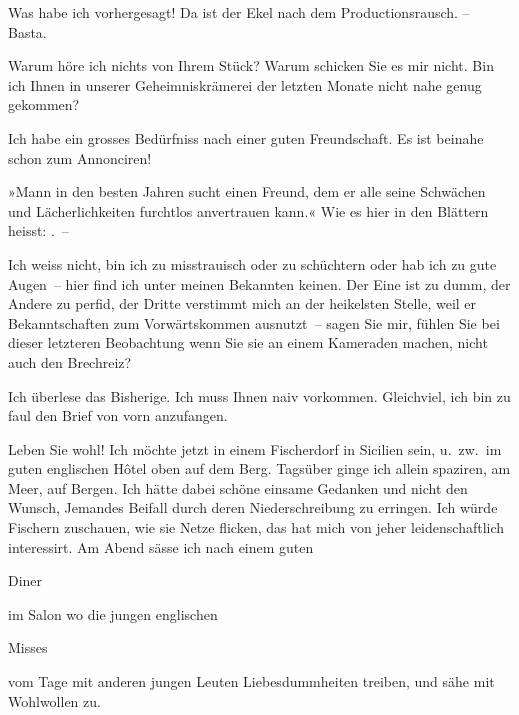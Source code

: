 \pstart
           Was habe ich vorhergesagt! Da ist der Ekel nach dem Productionsrausch. – Basta.\pend
           
\pstart
           Warum höre ich nichts von Ihrem Stück? Warum schicken Sie es mir nicht. Bin ich Ihnen in unserer
               Geheimniskrämerei der letzten Monate nicht nahe genug gekommen?\pend
           
\pstart
           Ich habe ein grosses Bedürfniss nach einer guten Freundschaft. Es ist beinahe schon
               zum Annonciren!\pend
           
\pstart
           »Mann in den besten Jahren sucht einen Freund, dem er alle seine Schwächen und
               Lächerlichkeiten furchtlos anvertrauen kann.« Wie es hier in den Blättern {\pb}heisst: \label{K_L03848-2v}\label{K_L03848-2}. –\pend
           
\pstart
           Ich weiss nicht, bin ich zu misstrauisch oder zu schüchtern oder  hab ich zu gute Augen – hier find ich unter meinen
               Bekannten keinen. Der Eine ist zu dumm, der Andere zu perfid, der Dritte verstimmt
               mich an der heikelsten Stelle, weil er Bekanntschaften zum Vorwärtskommen ausnutzt –
               sagen Sie mir, fühlen Sie bei dieser letzteren Beobachtung wenn Sie sie an einem
               Kameraden machen, nicht auch den Brechreiz?\pend
           
\pstart
           Ich überlese das Bisherige. Ich muss Ihnen naiv vorkommen. Gleichviel, ich bin zu
               faul den Brief von vorn anzufangen.\pend
           
\pstart
           Leben Sie wohl! Ich möchte jetzt in einem Fischerdorf in Sicilien sein, u. zw. im guten englischen Hôtel oben auf dem
               Berg. Tagsüber ginge ich allein {\pb}spaziren, am Meer, auf Bergen. Ich hätte dabei schöne einsame Gedanken und nicht
               den Wunsch, Jemandes Beifall durch deren Niederschreibung zu erringen. Ich würde
               Fischern zuschauen, wie sie Netze flicken, das hat mich von jeher leidenschaftlich
               interessirt. Am Abend sässe ich nach einem guten \begin{otherlanguage}{french}Diner\end{otherlanguage}{ }im Salon wo die jungen
               englischen \begin{otherlanguage}{english}Misses\end{otherlanguage} vom Tage mit anderen jungen Leuten Liebesdummheiten treiben, und
               sähe mit Wohlwollen zu.\pend
           
